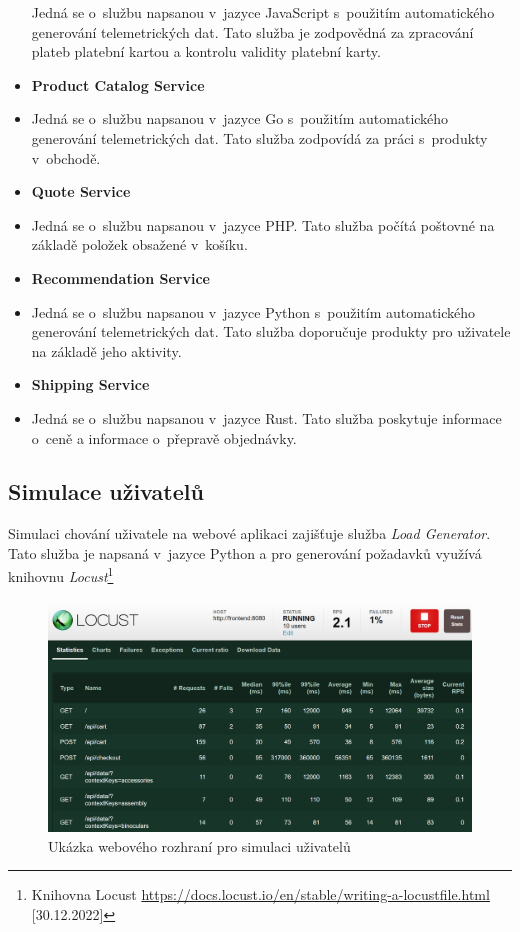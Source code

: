 \begin{itemize}
        Jedná se o~službu napsanou v~jazyce JavaScript s~použitím automatického generování telemetrických dat. Tato služba je zodpovědná za zpracování plateb platební kartou a kontrolu validity platební karty.
        \item{\textbf{Product Catalog Service}}
        \item[]
        Jedná se o~službu napsanou v~jazyce Go s~použitím automatického generování telemetrických dat. Tato služba zodpovídá za práci s~produkty v~obchodě. 
        \item{\textbf{Quote Service}}
        \item[]
        Jedná se o~službu napsanou v~jazyce PHP. Tato služba počítá poštovné na základě položek obsažené v~košíku.
        \item{\textbf{Recommendation Service}}
        \item[]
        Jedná se o~službu napsanou v~jazyce Python s~použitím automatického generování telemetrických dat. Tato služba doporučuje produkty pro uživatele na základě jeho aktivity.
        \item{\textbf{Shipping Service}}
        \item[]
        Jedná se o~službu napsanou v~jazyce Rust. Tato služba poskytuje informace o~ceně a informace o~přepravě objednávky.
    \end{itemize}

\subsection{Simulace uživatelů}
Simulaci chování uživatele na webové aplikaci zajišťuje služba \textit{Load Generator}. Tato služba je napsaná v~jazyce Python a pro generování požadavků využívá knihovnu \textit{Locust}\footnote{Knihovna Locust \url{https://docs.locust.io/en/stable/writing-a-locustfile.html} [30.12.2022]}

\begin{figure}[H]
  \centering
  \includegraphics[width=15cm]{obrazky-figures/locust.png}
  \caption{Ukázka webového rozhraní pro simulaci uživatelů}
  \label{fig:locust}
\end{figure}

